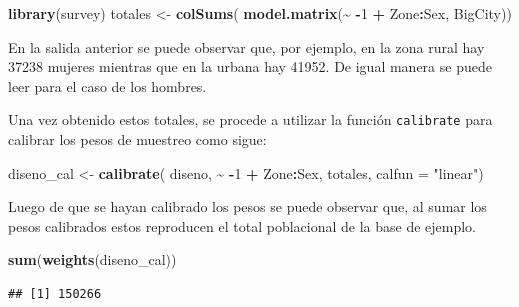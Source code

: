 \documentclass[
  spanish,
  12pt,
]{book}
\newenvironment{Shaded}{\begin{snugshade}}{\end{snugshade}}
\newcommand{\AttributeTok}[1]{\textcolor[rgb]{0.13,0.29,0.53}{#1}}
\newcommand{\DecValTok}[1]{\textcolor[rgb]{0.00,0.00,0.81}{#1}}
\newcommand{\FunctionTok}[1]{\textcolor[rgb]{0.13,0.29,0.53}{\textbf{#1}}}
\newcommand{\NormalTok}[1]{#1}
\newcommand{\OtherTok}[1]{\textcolor[rgb]{0.56,0.35,0.01}{#1}}
\newcommand{\SpecialCharTok}[1]{\textcolor[rgb]{0.81,0.36,0.00}{\textbf{#1}}}
\newcommand{\StringTok}[1]{\textcolor[rgb]{0.31,0.60,0.02}{#1}}
\begin{document}
\begin{Shaded}
\begin{Highlighting}[]
\FunctionTok{library}\NormalTok{(survey)}
\NormalTok{totales }\OtherTok{\textless{}{-}} \FunctionTok{colSums}\NormalTok{(}
  \FunctionTok{model.matrix}\NormalTok{(}\SpecialCharTok{\textasciitilde{}} \SpecialCharTok{{-}}\DecValTok{1} \SpecialCharTok{+}\NormalTok{ Zone}\SpecialCharTok{:}\NormalTok{Sex, BigCity)) }
\end{Highlighting}
\end{Shaded}

En la salida anterior se puede observar que, por ejemplo, en la zona rural hay 37238 mujeres mientras que en la urbana hay 41952. De igual manera se puede leer para el caso de los hombres.

Una vez obtenido estos totales, se procede a utilizar la función \texttt{calibrate} para calibrar los pesos de muestreo como sigue:

\begin{Shaded}
\begin{Highlighting}[]
\NormalTok{diseno\_cal }\OtherTok{\textless{}{-}} \FunctionTok{calibrate}\NormalTok{(}
\NormalTok{  diseno, }\SpecialCharTok{\textasciitilde{}} \SpecialCharTok{{-}}\DecValTok{1} \SpecialCharTok{+}\NormalTok{ Zone}\SpecialCharTok{:}\NormalTok{Sex, totales, }\AttributeTok{calfun =} \StringTok{"linear"}\NormalTok{)  }
\end{Highlighting}
\end{Shaded}

Luego de que se hayan calibrado los pesos se puede observar que, al sumar los pesos calibrados estos reproducen el total poblacional de la base de ejemplo.

\begin{Shaded}
\begin{Highlighting}[]
\FunctionTok{sum}\NormalTok{(}\FunctionTok{weights}\NormalTok{(diseno\_cal))}
\end{Highlighting}
\end{Shaded}

\begin{verbatim}
## [1] 150266
\end{verbatim}

\begin{Shaded}
\end{Shaded}
\end{document}
